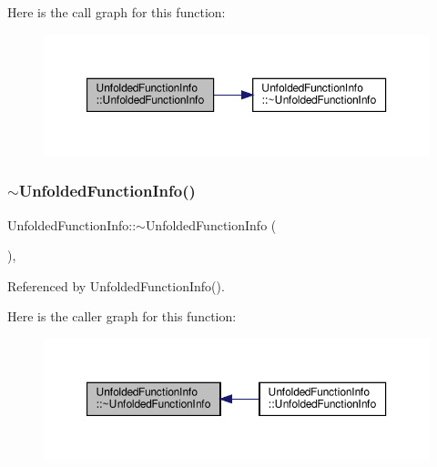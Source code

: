 Here is the call graph for this function\+:
\nopagebreak
\begin{figure}[H]
\begin{center}
\leavevmode
\includegraphics[width=350pt]{d9/d73/classUnfoldedFunctionInfo_a4c9c604772e8af984faeb4aac90f56bb_cgraph}
\end{center}
\end{figure}
\mbox{\label{classUnfoldedFunctionInfo_acce69e265c0397a02368c8ccfb654d70}} 
\subsubsection{\texorpdfstring{$\sim$\+Unfolded\+Function\+Info()}{~UnfoldedFunctionInfo()}}
{\footnotesize\ttfamily Unfolded\+Function\+Info\+::$\sim$\+Unfolded\+Function\+Info (\begin{DoxyParamCaption}{ }\end{DoxyParamCaption})\hspace{0.3cm}{\ttfamily [override]}, {\ttfamily [default]}}



Referenced by Unfolded\+Function\+Info().

Here is the caller graph for this function\+:
\nopagebreak
\begin{figure}[H]
\begin{center}
\leavevmode
\includegraphics[width=350pt]{d9/d73/classUnfoldedFunctionInfo_acce69e265c0397a02368c8ccfb654d70_icgraph}
\end{center}
\end{figure}


